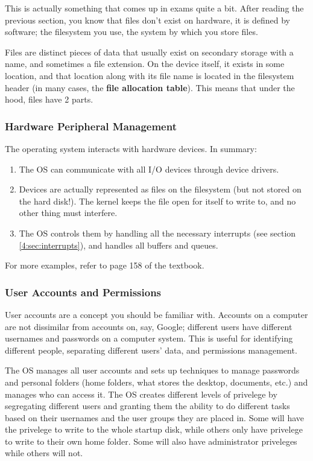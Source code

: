 \documentclass[../main.tex]{subfiles}
\begin{document}
This is actually something that comes up in exams quite a bit. After reading the previous section, you know that files don't exist on hardware, it is defined by software; the filesystem you use, the system by which you store files.

Files are distinct pieces of data that usually exist on secondary storage with a name, and sometimes a file extension. On the device itself, it exists in some location, and that location along with its file name is located in the filesystem header (in many cases, the \textbf{file allocation table}). This means that under the hood, files have 2 parts.

\subsubsection{Hardware Peripheral Management}

The operating system interacts with hardware devices. In summary:

\begin{enumerate}
    \item The OS can communicate with all I/O devices through device drivers.
    \item Devices are actually represented as files on the filesystem (but not stored on the hard disk!). The kernel keeps the file open for itself to write to, and no other thing must interfere.
    \item The OS controls them by handling all the necessary interrupts (see section \ref{4:sec:interrupts}), and handles all buffers and queues.
\end{enumerate}

For more examples, refer to page 158 of the textbook.

\subsubsection{User Accounts and Permissions}

User accounts are a concept you should be familiar with. Accounts on a computer are not dissimilar from accounts on, say, Google; different users have different usernames and passwords on a computer system. This is useful for identifying different people, separating different users' data, and permissions management.

The OS manages all user accounts and sets up techniques to manage passwords and personal folders (home folders, what stores the desktop, documents, etc.) and manages who can access it. The OS creates different levels of privelege by segregating different users and granting them the ability to do different tasks based on their usernames and the user groups they are placed in. Some will have the privelege to write to the whole startup disk, while others only have privelege to write to their own home folder. Some will also have administrator priveleges while others will not.
\end{document}
